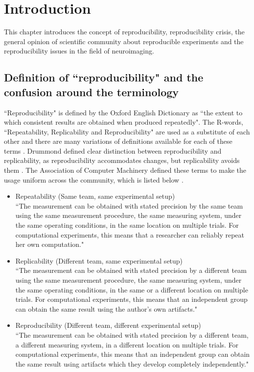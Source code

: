 \chapter{Introduction}
This chapter introduces the concept of reproducibility, reproducibility crisis, the general opinion of scientific community about reproducible experiments and the reproducibility issues in the field of neuroimaging. 

\section{Definition of ``reproducibility" and the confusion around the terminology}

``Reproducibility" is defined by the Oxford English Dictionary as ``the extent to which consistent results are obtained when produced repeatedly". The R-words, ``Repeatability, Replicability and Reproducibility" are used as a substitute of each other and there are many variations of definitions available for each of these terms \cite{Plesser2018}. Drummond defined clear distinction between reproducibility and replicability, as reproducibility accommodates changes, but replicability avoids them \cite{Drummond}. The Association of Computer Machinery defined these terms to make the usage uniform across the community, which is listed below \cite{ACM2016}.

\begin{itemize}
\item {Repeatability (Same team, same experimental setup)\\}
      ``The measurement can be obtained with stated precision by the same team using the same measurement procedure, the same measuring system, under the same operating conditions, in the same location on multiple trials. For computational experiments, this means that a researcher can reliably repeat her own computation."
\item{Replicability (Different team, same experimental setup)\\}
      ``The measurement can be obtained with stated precision by a different team using the same measurement procedure, the same measuring system, under the same operating conditions, in the same or a different location on multiple trials. For computational experiments, this means that an independent group can obtain the same result using the author's own artifacts."
\item{Reproducibility (Different team, different experimental setup)\\}
      ``The measurement can be obtained with stated precision by a different team, a different measuring system, in a different location on multiple trials. For computational experiments, this means that an independent group can obtain the same result using artifacts which they develop completely independently."
\end{itemize}


